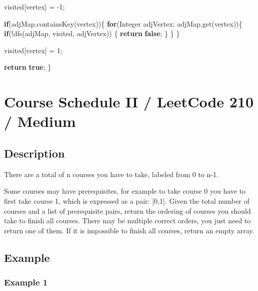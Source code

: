 \documentclass[]{book}
\newenvironment{Shaded}{\begin{snugshade}}{\end{snugshade}}
\newcommand{\BuiltInTok}[1]{#1}
\newcommand{\DecValTok}[1]{\textcolor[rgb]{0.00,0.00,0.81}{#1}}
\newcommand{\FunctionTok}[1]{\textcolor[rgb]{0.00,0.00,0.00}{#1}}
\newcommand{\KeywordTok}[1]{\textcolor[rgb]{0.13,0.29,0.53}{\textbf{#1}}}
\newcommand{\NormalTok}[1]{#1}
\begin{document}
\begin{Shaded}
\begin{Highlighting}[]
\NormalTok{    visited[vertex] = }\DecValTok{-1}\NormalTok{;}

    \KeywordTok{if}\NormalTok{(adjMap.}\FunctionTok{containsKey}\NormalTok{(vertex))\{}
        \KeywordTok{for}\NormalTok{(}\BuiltInTok{Integer}\NormalTok{ adjVertex: adjMap.}\FunctionTok{get}\NormalTok{(vertex))\{}
            \KeywordTok{if}\NormalTok{(!}\FunctionTok{dfs}\NormalTok{(adjMap, visited, adjVertex)) \{}
                \KeywordTok{return} \KeywordTok{false}\NormalTok{;}
\NormalTok{            \}}
\NormalTok{        \}}
\NormalTok{    \}}

\NormalTok{    visited[vertex] = }\DecValTok{1}\NormalTok{;}

    \KeywordTok{return} \KeywordTok{true}\NormalTok{;}
\NormalTok{\}}
\end{Highlighting}
\end{Shaded}

\hypertarget{course-schedule-ii-leetcode-210-medium}{%
\section{Course Schedule II / LeetCode 210 / Medium}\label{course-schedule-ii-leetcode-210-medium}}

\hypertarget{description-84}{%
\subsection{Description}\label{description-84}}

There are a total of n courses you have to take, labeled from 0 to n-1.

Some courses may have prerequisites, for example to take course 0 you have to first take course 1, which is expressed
as a pair: {[}0,1{]}. Given the total number of courses and a list of prerequisite pairs, return the ordering of courses
you should take to finish all courses. There may be multiple correct orders, you just need to return one of them. If
it is impossible to finish all courses, return an empty array.

\hypertarget{example-80}{%
\subsection{Example}\label{example-80}}

\hypertarget{example-1-2}{%
\subsubsection{Example 1}\label{example-1-2}}
\end{document}
